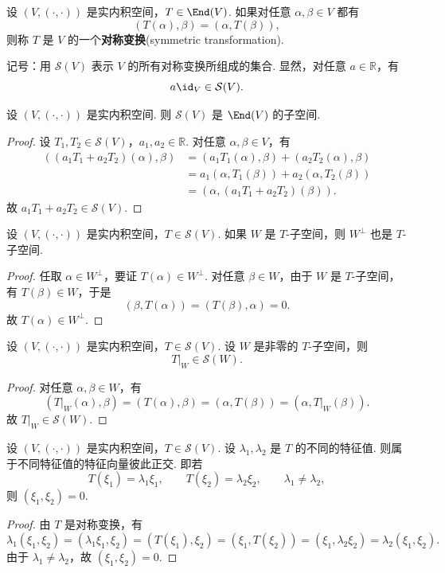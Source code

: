 \begin{definition}\label{p1:concept:c6-l1545}
	设 $(V,(\cdot,\cdot))$ 是实内积空间，$T\in\End(V)$. 如果对任意 $\alpha,\beta\in V$ 都有
	\[
	(T(\alpha),\beta)=(\alpha,T(\beta)),
	\]
	则称 $T$ 是 $V$ 的一个\textbf{对称变换}(symmetric transformation).
\end{definition}

记号：用 $\mathcal{S}(V)$ 表示 $V$ 的所有对称变换所组成的集合. 显然，对任意 $a\in\mathbb{R}$，有
\[
a\id_V\in\mathcal{S}(V).
\]

\begin{lemma}
	设 $(V,(\cdot,\cdot))$ 是实内积空间. 则 $\mathcal{S}(V)$ 是 $\End(V)$ 的子空间.
\end{lemma}
\begin{proof}
	设 $T_1,T_2\in\mathcal{S}(V)$，$a_1,a_2\in\mathbb{R}$. 对任意 $\alpha,\beta\in V$，有
	\[
	\begin{aligned}
		((a_1T_1+a_2T_2)(\alpha),\beta)
		&=(a_1T_1(\alpha),\beta)+(a_2T_2(\alpha),\beta)\\
		&=a_1(\alpha,T_1(\beta))+a_2(\alpha,T_2(\beta))\\
		&=(\alpha,(a_1T_1+a_2T_2)(\beta)).
	\end{aligned}
	\]
	故 $a_1T_1+a_2T_2\in\mathcal{S}(V)$.
\end{proof}

\begin{lemma}
	设 $(V,(\cdot,\cdot))$ 是实内积空间，$T\in\mathcal{S}(V)$. 如果 $W$ 是 $T$-子空间，则 $W^\perp$ 也是 $T$-子空间.
\end{lemma}
\begin{proof}
	任取 $\alpha\in W^\perp$，要证 $T(\alpha)\in W^\perp$. 对任意 $\beta\in W$，由于 $W$ 是 $T$-子空间，有 $T(\beta)\in W$，于是
	\[
	(\beta,T(\alpha))=(T(\beta),\alpha)=0.
	\]
	故 $T(\alpha)\in W^\perp$.
\end{proof}

\begin{example}
	设 $(V,(\cdot,\cdot))$ 是实内积空间，$T\in\mathcal{S}(V)$. 设 $W$ 是非零的 $T$-子空间，则
	\[
	T|_W\in\mathcal{S}(W).
	\]
\end{example}
\begin{proof}
	对任意 $\alpha,\beta\in W$，有
	\[
	(T|_W(\alpha),\beta)=(T(\alpha),\beta)=(\alpha,T(\beta))=(\alpha,T|_W(\beta)).
	\]
	故 $T|_W\in\mathcal{S}(W)$.
\end{proof}

\begin{lemma}
	设 $(V,(\cdot,\cdot))$ 是实内积空间，$T\in\mathcal{S}(V)$. 设 $\lambda_1,\lambda_2$ 是 $T$ 的不同的特征值. 则属于不同特征值的特征向量彼此正交. 即若
	\[
	T(\xi_1)=\lambda_1\xi_1,
	\qquad
	T(\xi_2)=\lambda_2\xi_2,
	\qquad
	\lambda_1\ne\lambda_2,
	\]
	则 $(\xi_1,\xi_2)=0$.
\end{lemma}
\begin{proof}
	由 $T$ 是对称变换，有
	\[
	\lambda_1(\xi_1,\xi_2)=(\lambda_1\xi_1,\xi_2)=(T(\xi_1),\xi_2)=(\xi_1,T(\xi_2))=(\xi_1,\lambda_2\xi_2)=\lambda_2(\xi_1,\xi_2).
	\]
	由于 $\lambda_1\ne\lambda_2$，故 $(\xi_1,\xi_2)=0$.
\end{proof}



